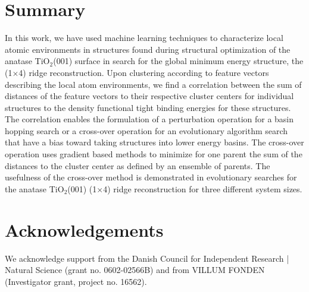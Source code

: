 \documentclass[aip,amsmath,amssymb,reprint]{revtex4-1}
\begin{document}
\section{Summary}
In this work, we have used machine learning techniques to characterize
local atomic environments in structures found during structural
optimization of the anatase TiO$_2$(001) surface in search for the
global minimum energy structure, the (1$\times$4) ridge
reconstruction. Upon clustering according to feature vectors
describing the local atom environments, we find a correlation between
the sum of distances of the feature vectors to their respective
cluster centers for individual structures to the density functional
tight binding energies for these structures. The correlation enables
the formulation of a perturbation operation for a basin hopping search or
a cross-over operation for an
evolutionary algorithm search that have a bias toward taking structures
into lower energy basins. The cross-over operation uses gradient based methods to minimize
for one parent the sum of the distances to the cluster center as defined by an ensemble of parents.
The usefulness of the cross-over method is demonstrated in
evolutionary searches for the anatase TiO$_2$(001) (1$\times$4) ridge
reconstruction for three different system sizes.



\section{Acknowledgements}

We acknowledge support from the Danish Council for Independent Research | Natural Science (grant no. 0602-02566B) and from VILLUM FONDEN (Investigator grant, project no. 16562).
\end{document}
